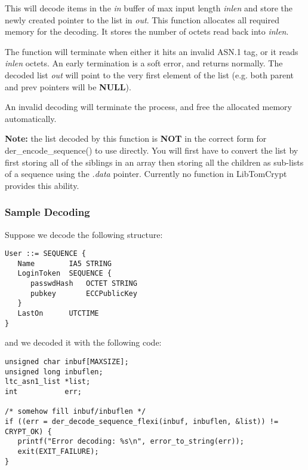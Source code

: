 \documentclass[synpaper]{book}
\begin{document}
This will decode items in the \textit{in} buffer of max input length \textit{inlen} and store the newly created pointer to the list in \textit{out}.  This function allocates
all required memory for the decoding.  It stores the number of octets read back into \textit{inlen}.

The function will terminate when either it hits an invalid ASN.1 tag, or it reads \textit{inlen} octets.  An early termination is a soft error, and returns
normally.  The decoded list \textit{out} will point to the very first element of the list (e.g. both parent and prev pointers will be \textbf{NULL}).  

An invalid decoding will terminate the process, and free the allocated memory automatically.  

\textbf{Note:} the list decoded by this function is \textbf{NOT} in the correct form for der\_encode\_sequence() to use directly.  You will first
have to convert the list by first storing all of the siblings in an array then storing all the children as sub-lists of a sequence using the \textit{.data} 
pointer.  Currently no function in LibTomCrypt provides this ability.

\subsubsection{Sample Decoding}
Suppose we decode the following structure:
\begin{small}
\begin{verbatim}
User ::= SEQUENCE {
   Name        IA5 STRING
   LoginToken  SEQUENCE {
      passwdHash   OCTET STRING
      pubkey       ECCPublicKey
   }
   LastOn      UTCTIME
}
\end{verbatim}
\end{small}
\begin{flushleft}and we decoded it with the following code:\end{flushleft}

\begin{small}
\begin{verbatim}
unsigned char inbuf[MAXSIZE];
unsigned long inbuflen;
ltc_asn1_list *list;
int           err;

/* somehow fill inbuf/inbuflen */
if ((err = der_decode_sequence_flexi(inbuf, inbuflen, &list)) != CRYPT_OK) {
   printf("Error decoding: %s\n", error_to_string(err));
   exit(EXIT_FAILURE);
}
\end{verbatim}
\end{small}
\end{document}
